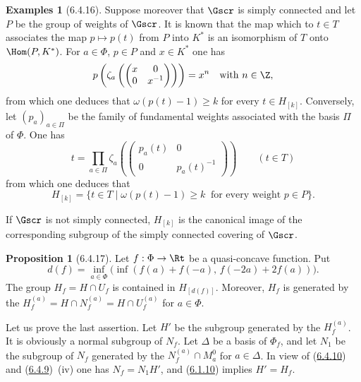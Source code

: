 \documentclass[12pt,a4paper,oneside,english]{smfart}
\makeatletter
\newcommand{\btanchor}[1]{\leavevmode\Hy@raisedlink{\hypertarget{bt:#1}{}}}
\newcommand{\btref}[1]{\hyperlink{bt:#1}{#1}}
\theoremstyle{definition}
\theoremstyle{bt}
\newtheorem{prop}{Proposition}
\newtheorem{exams}{Examples}
\makeatother
\begin{document}
\begin{exams}[6.4.16]
Suppose moreover that $\Gscr$ is simply connected and let $P$ be the group
of weights of $\Gscr$. It is known that the map which to $t\in T$ associates
the map $p\mapsto p(t)$ from $P$ into $K^{*}$ is an isomorphism of $T$ onto
$\Hom(P,K^{*})$. For $a\in\Phi$, $p\in P$ and $x\in K^{*}$ one has
\[
  p\left(\zeta_a\left(\begin{pmatrix}x&0\\0&x^{-1}\end{pmatrix}\right)\right)    =x^{n}\quad\text{with }n\in\Z,
\]
from which one deduces that $\omega(p(t)-1)\geq k$ for every $t\in H_{[k]}$.
Conversely, let $(p_a)_{a\in\Pi}$ be the family of fundamental weights
associated with the basis $\Pi$ of $\Phi$. One has
\[
  t=\prod_{a\in\Pi}\zeta_a\left(\begin{pmatrix}p_a(t)&0\\0&p_a(t)^{-1}
   \end{pmatrix}\right)\qquad(t\in T)
\]
from which one deduces that
\[
  H_{[k]}=\{t\in T\mid\omega(p(t)-1)\geq k\ \text{ for every weight }p\in P\}.
\]

If $\Gscr$ is not simply connected, $H_{[k]}$ is the canonical image of the
corresponding subgroup of the simply connected covering of $\Gscr$.
\end{exams}

\begin{prop}[6.4.17]\btanchor{6.4.17}
Let $f:\Phi\to\Rt$ be a quasi-concave function. Put
\[
  d(f)=\inf_{a\in\Phi}\big(\inf(f(a)+f(-a),\,f(-2a)+2f(a))\big).
\]
The group $H_f=H\cap U_f$ is contained in $H_{[d(f)]}$. Moreover, $H_f$ is
generated by the $H_f^{(a)}=H\cap N_f^{(a)}=H\cap U_f^{(a)}$ for $a\in\Phi$.
\end{prop}

Let us prove the last assertion. Let $H'$ be the subgroup generated by the
$H_f^{(a)}$. It is obviously a normal subgroup of $N_f$. Let $\Delta$ be a
basis of $\Phi_f$, and let $N_1$ be the subgroup of $N_f$ generated by the
$N_f^{(a)}\cap M_a^{0}$ for $a\in\Delta$. In view of (\btref{6.4.10}) and
(\btref{6.4.9})~(iv) one has $N_f=N_1H'$, and (\btref{6.1.10}) implies $H'=H_f$.
\end{document}
